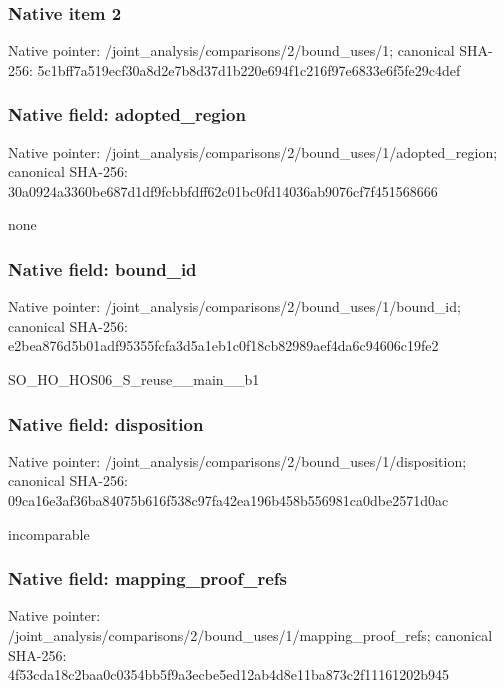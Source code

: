 \documentclass[10pt,a4paper]{article}
\begin{document}
\subsubsection{Native item 2}
Native pointer: /joint\_\allowbreak{}analysis/comparisons/2/bound\_\allowbreak{}uses/1; canonical SHA-256: 5c1bff7a519ecf30a8d2e7b8d37d1b220e694f1c216f97e6833e6f5fe29c4def

\subsubsection{Native field: adopted\_\allowbreak{}region}
Native pointer: /joint\_\allowbreak{}analysis/comparisons/2/bound\_\allowbreak{}uses/1/adopted\_\allowbreak{}region; canonical SHA-256: 30a0924a3360be687d1df9fcbbfdff62c01bc0fd14036ab9076cf7f451568666

\begingroup\raggedright\sloppy none\par\endgroup

\subsubsection{Native field: bound\_\allowbreak{}id}
Native pointer: /joint\_\allowbreak{}analysis/comparisons/2/bound\_\allowbreak{}uses/1/bound\_\allowbreak{}id; canonical SHA-256: e2bea876d5b01adf95355fcfa3d5a1eb1c0f18cb82989aef4da6c94606c19fe2

\begingroup\raggedright\sloppy SO\_\allowbreak{}HO\_\allowbreak{}HOS06\_\allowbreak{}S\_\allowbreak{}reuse\_\allowbreak{}\_\allowbreak{}main\_\allowbreak{}\_\allowbreak{}b1\par\endgroup

\subsubsection{Native field: disposition}
Native pointer: /joint\_\allowbreak{}analysis/comparisons/2/bound\_\allowbreak{}uses/1/disposition; canonical SHA-256: 09ca16e3af36ba84075b616f538c97fa42ea196b458b556981ca0dbe2571d0ac

\begingroup\raggedright\sloppy incomparable\par\endgroup

\subsubsection{Native field: mapping\_\allowbreak{}proof\_\allowbreak{}refs}
Native pointer: /joint\_\allowbreak{}analysis/comparisons/2/bound\_\allowbreak{}uses/1/mapping\_\allowbreak{}proof\_\allowbreak{}refs; canonical SHA-256: 4f53cda18c2baa0c0354bb5f9a3ecbe5ed12ab4d8e11ba873c2f11161202b945
\end{document}
